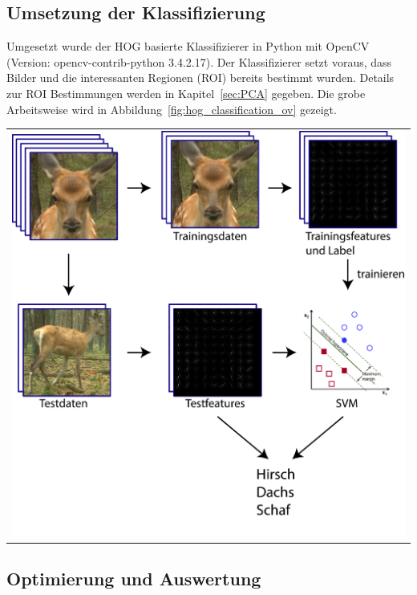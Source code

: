 \subsection{Umsetzung der Klassifizierung}
Umgesetzt wurde der HOG basierte Klassifizierer in Python mit OpenCV (Version: opencv-contrib-python 3.4.2.17). Der Klassifizierer setzt voraus, dass Bilder und die interessanten Regionen (ROI) bereits bestimmt wurden. Details zur ROI Bestimmungen werden in Kapitel~\ref{sec:PCA} gegeben. Die grobe Arbeitsweise wird in Abbildung~\ref{fig:hog_classification_ov} gezeigt. 
\begin{center}
\begin{tabular}{c}
\includegraphics[trim={0 0cm 0cm 0cm},clip=true,width=13cm]{img/ClassificationOverview.png}
\end{tabular}
\label{fig:hog_classification_ov}
\end{center}


\subsection{Optimierung und Auswertung}


